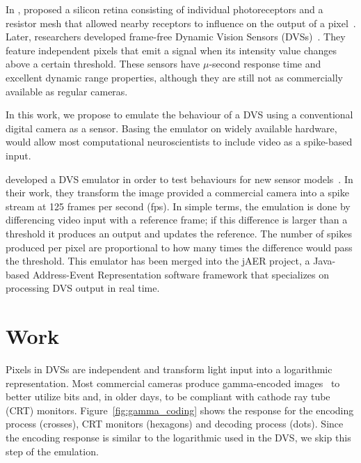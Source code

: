 \documentclass[twocolumn]{article}
\begin{document}
In \citeyear{Mead1989}, \citeauthor{Mead1989} proposed a silicon retina consisting of individual photoreceptors and a resistor mesh that allowed nearby receptors to influence on the output of a pixel~\cite{Mead1989}. 
Later, researchers developed frame-free Dynamic Vision Sensors (DVSs)~\cite{delbruck_dvs,bernabe_dvs}. They feature independent pixels that emit a signal when its intensity value changes above a certain threshold. These sensors have $\mu$-second response time and excellent dynamic range properties, although they are still not as commercially available as regular cameras.

In this work, we propose to emulate the behaviour of a DVS using a conventional digital camera as a sensor. Basing the emulator on widely available hardware, would allow most computational neuroscientists to include video as a spike-based input.


\citeauthor{dvs_emu} developed a DVS emulator in order to test behaviours for new sensor models~\cite{dvs_emu}. In their work, they transform the image provided a commercial camera into a spike stream at 125 frames per second (fps). In simple terms, the emulation is done by differencing video input with a reference frame; if this difference is larger than a threshold it produces an output and updates the reference. The number of spikes produced per pixel are proportional to how many times the difference would pass the threshold. This emulator has been merged into the jAER project, a Java-based Address-Event Representation software framework that specializes on processing DVS output in real time.


\section{Work}

Pixels in DVSs are independent and transform light input into a logarithmic representation. Most commercial cameras produce gamma-encoded images~\cite{Poynton_digital_video} to better utilize bits and, in older days, to be compliant with cathode ray tube (CRT) monitors. Figure~\ref{fig:gamma_coding} shows the response for the encoding process (crosses), CRT monitors (hexagons) and decoding process (dots). Since the encoding response is similar to the logarithmic used in the DVS, we skip this step of the emulation.
\end{document}
